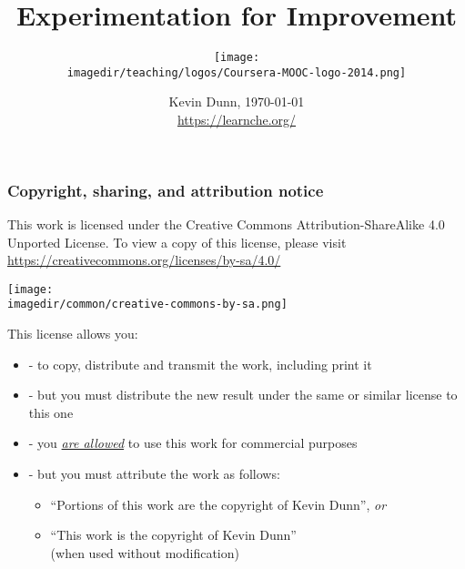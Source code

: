 \documentclass[11pt,aspectratio=169,mathserif]{beamer}
\title[]{\LARGE Experimentation for Improvement}
\subtitle[]{\vspace{0.5cm} \texttt{[image: \\imagedir/teaching/logos/Coursera-MOOC-logo-2014.png]} \vspace{-1.5cm} }\author[]{}
\institute[]{}
\date[]{Kevin Dunn, \today \\ \vspace{0cm}
{{\footnotesize {\tt } \href{https://learnche.org/}{https://learnche.org/}\\} \vspace{0.5cm}}
{\LARGE \color{blue}{Design and Analysis of Experiments - An Overview}}
}
\begin{document}
\begin{frame} \titlepage \end{frame}
\begin{frame}\frametitle{Copyright, sharing, and attribution notice}

	{\footnotesize This work is licensed under the Creative Commons Attribution-ShareAlike 4.0 Unported License. To view a copy of this license,
	please visit \href{https://creativecommons.org/licenses/by-sa/4.0/}{https://creativecommons.org/licenses/by-sa/4.0/}}

	\vspace{0.0cm}
	\begin{flushright}
		\texttt{[image: \\imagedir/common/creative-commons-by-sa.png]}
	\end{flushright}
	\vspace{-0.4cm}
	\begin{exampleblock}{}
		{\small This license allows you: }
		\begin{itemize}
			\item	{} - to copy, distribute and transmit the work, including print it
			\item	{} - but you must distribute the new result under the same or similar license to this one
			\item	{} - you \underline{\emph{are allowed}} to use this work for commercial purposes
			\item	{} - but you must attribute the work as follows:
			\begin{itemize}
				\item	``Portions of this work are the copyright of Kevin Dunn'', \emph{or}
				\item	``This work is the copyright of Kevin Dunn'' \\{\tiny (when used without modification)}
			\end{itemize}
		\end{itemize}
	\end{exampleblock}
\end{frame}
\end{document}
